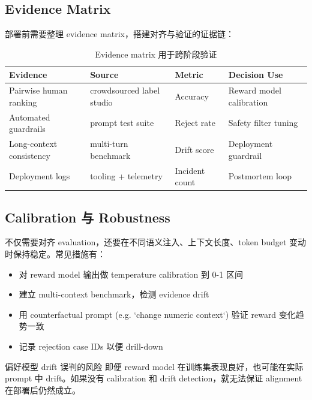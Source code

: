 \documentclass[a4paper]{article}
\begin{document}
\subsection{Evidence Matrix}

部署前需要整理 evidence matrix，搭建对齐与验证的证据链：

\begin{table}[H]
\centering
\begin{tabular}{p{} p{} p{} p{}}
\toprule
Evidence & Source & Metric & Decision Use \\
\midrule
Pairwise human ranking & crowdsourced label studio & Accuracy & Reward model calibration \\
Automated guardrails & prompt test suite & Reject rate & Safety filter tuning \\
Long-context consistency & multi-turn benchmark & Drift score & Deployment guardrail \\
Deployment logs & tooling + telemetry & Incident count & Postmortem loop \\
\bottomrule
\end{tabular}
\caption{Evidence matrix 用于跨阶段验证}
\end{table}

\subsection{Calibration 与 Robustness}

不仅需要对齐 evaluation，还要在不同语义注入、上下文长度、token budget 变动时保持稳定。常见措施有：

\begin{itemize}
    \item 对 reward model 输出做 temperature calibration 到 0-1 区间
    \item 建立 multi-context benchmark，检测 evidence drift
    \item 用 counterfactual prompt (e.g. `change numeric context`) 验证 reward 变化趋势一致
    \item 记录 rejection case IDs 以便 drill-down
\end{itemize}

\begin{warningbox}{偏好模型 drift 误判的风险}
即便 reward model 在训练集表现良好，也可能在实际 prompt 中 drift。如果没有 calibration 和 drift detection，就无法保证 alignment 在部署后仍然成立。
\end{warningbox}
\end{document}
